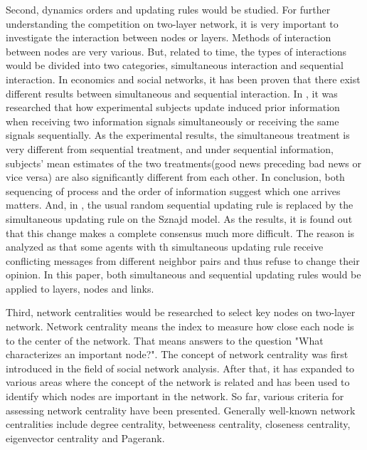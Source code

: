 Second, dynamics orders and updating rules would be studied. For further understanding the competition on two-layer network, it is very important to investigate the interaction between nodes or layers. Methods of interaction between nodes are very various.\parencite{sirbu2017} But, related to time, the types of interactions would be divided into two categories, simultaneous interaction and sequential interaction. In economics and social networks, it has been proven that there exist different results between simultaneous and sequential interaction.\parencite{hoffman2011, dietrich2004} In \parencite{hoffman2011}, it was researched that how experimental subjects update induced prior information when receiving two information signals simultaneously or receiving the same signals sequentially. As the experimental results, the simultaneous treatment is very different from sequential treatment, and under sequential information,  subjects’ mean estimates of the two treatments(good news preceding bad news or vice versa) are also significantly different from each other. In conclusion, both sequencing of process and the order of information suggest which one arrives matters. And, in \parencite{dietrich2004}, the usual random sequential updating rule is replaced by the simultaneous updating rule on the Sznajd model. As the results, it is found out that this change makes a complete consensus much more difficult. The reason is analyzed as that some agents with th simultaneous updating rule receive conflicting messages from different neighbor pairs and thus refuse to change their opinion. In this paper, both simultaneous and sequential updating rules would be applied to layers, nodes and links.

Third, network centralities would be researched to select key nodes on two-layer network. Network centrality means the index to measure how close each node is to the center of the network. That means answers to the question "What characterizes an important node?". The concept of network centrality was first introduced in the field of social network analysis.\parencite{freeman1979} After that, it has expanded to various areas where the concept of the network is related and has been used to identify which nodes are important in the network. So far, various criteria for assessing network centrality have been presented. Generally well-known network centralities include degree centrality, betweeness centrality, closeness centrality, eigenvector centrality and Pagerank.\parencite{koschutzki2008, francisco2019, bianconi2018}

